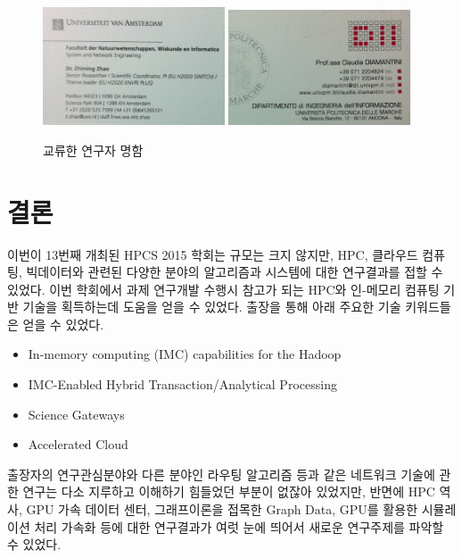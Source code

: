 \documentclass[twocolumn]{article}
\newcommand{\bi}{\begin{itemize}}
\newcommand{\ei}{\end{itemize}}
\newcommand{\ii}{\item}
\begin{document}
\begin{figure}[htb]
        \centering
        \includegraphics[width=0.48\textwidth]{nc02.png}
        \includegraphics[width=0.48\textwidth]{nc03.png}
        \caption{교류한 연구자 명함}
        \label{fig:namecards01}
\end{figure}

%

\section{결론}
이번이 13번째 개최된 HPCS 2015 학회는 규모는 크지 않지만, HPC, 클라우드 컴퓨팅, 빅데이터와 관련된 다양한 분야의 알고리즘과 시스템에 대한 연구결과를 접할 수 있었다.
이번 학회에서 과제 연구개발 수행시 참고가 되는 HPC와 인-메모리 컴퓨팅 기반 기술을 획득하는데 도움을 얻을 수 있었다. 출장을 통해 아래 주요한 기술 키워드들은 얻을 수 있었다.
\bi
\ii In-memory computing (IMC) capabilities for the Hadoop
\ii IMC-Enabled Hybrid Transaction/Analytical Processing
\ii Science Gateways
\ii Accelerated Cloud
\ei

출장자의 연구관심분야와 다른 분야인 라우팅 알고리즘 등과 같은 네트워크 기술에 관한 연구는 다소 지루하고 이해하기 힘들었던 부분이 없잖아 있었지만, 반면에 HPC 역사, GPU 가속 데이터 센터, 그래프이론을 접목한 Graph Data, GPU를 활용한 시뮬레이션 처리 가속화 등에 대한 연구결과가 여럿 눈에 띄어서 새로운 연구주제를 파악할 수 있었다.
\end{document}
